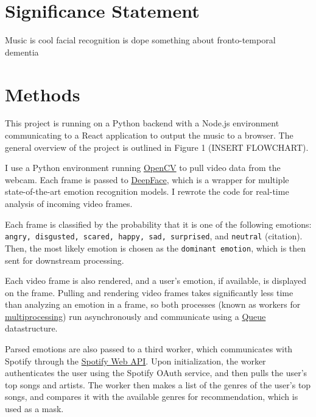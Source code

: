 \documentclass{article}
\renewcommand{\_}[1]{\underline{ #1 }}
\theoremstyle{definition}
\begin{document}
\section[Significance Statement]{Significance Statement}

Music is cool facial recognition is dope something about fronto-temporal dementia

\section[Methods]{Methods}
\label{Methods}

This project is running on a Python backend with a Node.js environment communicating to a React application to output the music to a browser. The general overview of the project is outlined in Figure 1 (INSERT FLOWCHART). 

I use a Python environment running \href{https://pypi.org/project/opencv-python/}{OpenCV} to pull video data from the webcam. Each frame is passed to \href{https://pypi.org/project/deepface/}{DeepFace}, which is a wrapper for multiple state-of-the-art emotion recognition models. I rewrote the code for real-time analysis of incoming video frames. 

Each frame is classified by the probability that it is one of the following emotions: \texttt{angry, disgusted, scared, happy, sad, surprised}, and \texttt{neutral} (citation). Then, the most likely emotion is chosen as the \texttt{dominant emotion}, which is then sent for downstream processing.

Each video frame is also rendered, and a user's emotion, if available, is displayed on the frame. Pulling and rendering video frames takes significantly less time than analyzing an emotion in a frame, so both processes (known as workers for \href{https://docs.python.org/3/library/multiprocessing.html}{multiprocessing}) run asynchronously and communicate using a  \href{https://docs.python.org/3/library/queue.html}{Queue} datastructure. 

Parsed emotions are also passed to a third worker, which communicates with Spotify through the \href{https://developer.spotify.com/documentation/web-api/}{Spotify Web API}. Upon initialization, the worker authenticates the user using the Spotify OAuth service, and then pulls the user's top songs and artists. The worker then makes a list of the genres of the user's top songs, and compares it with the available genres for recommendation, which is used as a mask. 
\end{document}
